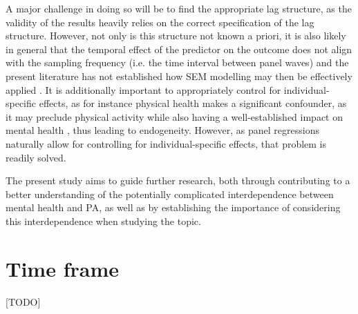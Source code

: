 \documentclass[a4paper,11pt]{report}
\begin{document}
A major challenge in doing so will be to find the appropriate lag structure, as the validity of the results heavily
relies on the correct specification of the lag structure. However, not only is this structure not known a priori,
it is also likely in general that the temporal effect of the predictor on the outcome does not align with the sampling
frequency (i.e. the time interval between panel waves) and the present literature has not established how SEM modelling
may then be effectively applied \cite{leszczensky2022deal}.
It is additionally important to appropriately control for individual-specific effects, as for instance physical
health makes a significant confounder, as it may preclude physical activity while also having a well-established impact
on mental health \cite{ohrnberger2017relationship}, thus leading to endogeneity. However, as panel regressions naturally
allow for controlling for individual-specific effects, that problem is readily solved.

The present study aims to guide further research, both through contributing to a better understanding of the potentially
complicated interdependence between mental health and PA, as well as by establishing the importance of considering this
interdependence when studying the topic.

\section*{Time frame}
[TODO]




\end{document}
